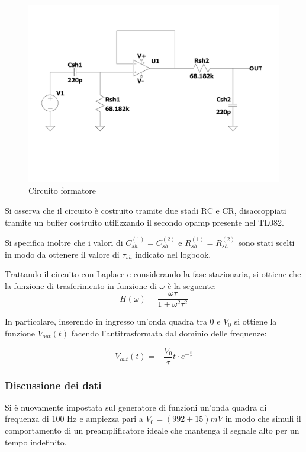\documentclass{article}
\begin{document}
\begin{center}
    \begin{figure}[H]
    \centering
    \includegraphics[scale=0.3, angle=0]{shaper.pdf}
    \caption{Circuito formatore}
    \label{fig:shaper}
    \end{figure}
\end{center}
    
Si osserva che il circuito è costruito tramite due stadi RC e CR, disaccoppiati tramite un buffer costruito utilizzando il secondo 
opamp presente nel TL082.

Si specifica inoltre che i valori di $C_{sh}^{(1)}=C_{sh}^{(2)}$ e $R_{sh}^{(1)}=R_{sh}^{(2)}$ sono stati scelti in modo da ottenere 
il valore di $\tau_{sh}$ indicato nel logbook.

Trattando il circuito con Laplace e considerando la fase stazionaria, si ottiene che la funzione di trasferimento in funzione di 
$\omega$ è la seguente:
\begin{equation}
H(\omega)=\frac{\omega \tau}{1+\omega^2\tau^2}
\end{equation}

In particolare, inserendo in ingresso un'onda quadra tra 0 e $V_0$ si ottiene la funzione $V_{out}(t)$ facendo l'antitrasformata 
dal dominio delle frequenze:

\begin{equation}
    \label{eqn:V_sh}
    V_{out}(t)= - \frac{V_0}{\tau} t \cdot e^{-\frac{t}{\tau}}
\end{equation}
    

\subsubsection{Discussione dei dati}
Si è nuovamente impostata sul generatore di funzioni un'onda quadra di frequenza di 100 Hz e ampiezza pari a $V_{0}=(992 \pm 15)mV$
in modo che simuli il comportamento di un preamplificatore ideale che mantenga il segnale alto per un tempo indefinito.
\end{document}
